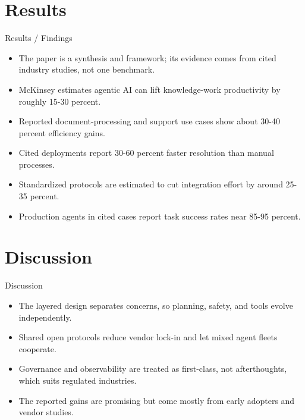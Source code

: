\documentclass[10pt]{beamer}
\begin{document}
\section{Results}
\begin{frame}[allowframebreaks]{Results / Findings}
\begin{itemize}
  \item The paper is a synthesis and framework; its evidence comes from cited industry studies, not one benchmark.
  \item McKinsey estimates agentic AI can lift knowledge-work productivity by roughly 15-30 percent.
  \item Reported document-processing and support use cases show about 30-40 percent efficiency gains.
  \item Cited deployments report 30-60 percent faster resolution than manual processes.
  \item Standardized protocols are estimated to cut integration effort by around 25-35 percent.
  \item Production agents in cited cases report task success rates near 85-95 percent.
\end{itemize}
\end{frame}
\section{Discussion}
\begin{frame}{Discussion}
\begin{itemize}
  \item The layered design separates concerns, so planning, safety, and tools evolve independently.
  \item Shared open protocols reduce vendor lock-in and let mixed agent fleets cooperate.
  \item Governance and observability are treated as first-class, not afterthoughts, which suits regulated industries.
  \item The reported gains are promising but come mostly from early adopters and vendor studies.
\end{itemize}
\end{frame}
\end{document}
